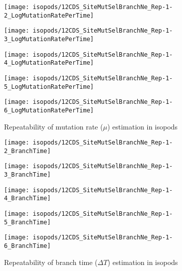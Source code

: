 \begin{figure}[H]
    \centering
    \begin{minipage}{0.32\linewidth}
        \texttt{[image: isopods/12CDS\_SiteMutSelBranchNe\_Rep-1-2\_LogMutationRatePerTime]}
    \end{minipage} \hfill
    \begin{minipage}{0.32\linewidth}
        \texttt{[image: isopods/12CDS\_SiteMutSelBranchNe\_Rep-1-3\_LogMutationRatePerTime]}
    \end{minipage} \hfill
    \begin{minipage}{0.32\linewidth}
        \texttt{[image: isopods/12CDS\_SiteMutSelBranchNe\_Rep-1-4\_LogMutationRatePerTime]}
    \end{minipage}
    \begin{minipage}{0.32\linewidth}
        \texttt{[image: isopods/12CDS\_SiteMutSelBranchNe\_Rep-1-5\_LogMutationRatePerTime]}
    \end{minipage}
    \begin{minipage}{0.32\linewidth}
        \texttt{[image: isopods/12CDS\_SiteMutSelBranchNe\_Rep-1-6\_LogMutationRatePerTime]}
    \end{minipage}
    \caption[Repeatability of $\mu$ estimation in isopods]{Repeatability of mutation rate ($\mu$) estimation in isopods}
\end{figure}

\begin{figure}[H]
    \centering
    \begin{minipage}{0.32\linewidth}
        \texttt{[image: isopods/12CDS\_SiteMutSelBranchNe\_Rep-1-2\_BranchTime]}
    \end{minipage} \hfill
    \begin{minipage}{0.32\linewidth}
        \texttt{[image: isopods/12CDS\_SiteMutSelBranchNe\_Rep-1-3\_BranchTime]}
    \end{minipage} \hfill
    \begin{minipage}{0.32\linewidth}
        \texttt{[image: isopods/12CDS\_SiteMutSelBranchNe\_Rep-1-4\_BranchTime]}
    \end{minipage}
    \begin{minipage}{0.32\linewidth}
        \texttt{[image: isopods/12CDS\_SiteMutSelBranchNe\_Rep-1-5\_BranchTime]}
    \end{minipage}
    \begin{minipage}{0.32\linewidth}
        \texttt{[image: isopods/12CDS\_SiteMutSelBranchNe\_Rep-1-6\_BranchTime]}
    \end{minipage}
    \caption[Repeatability of branch time estimation in isopods]{Repeatability of branch time ($\Delta T$) estimation in isopods}
\end{figure}

